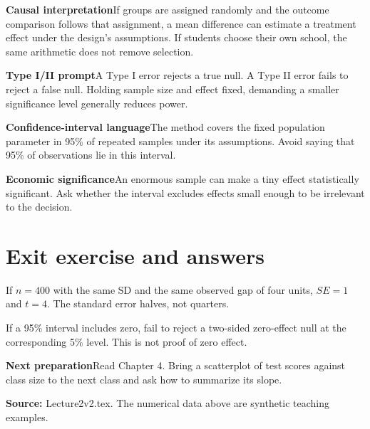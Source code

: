 \documentclass[11pt,a4paper]{article}
\newcommand{\heading}[1]{\section*{\color{accent}#1}}
\newcommand{\cue}[2]{\par\noindent\textbf{#1}\quad #2\par}
\begin{document}
\cue{Causal interpretation}{If groups are assigned randomly and the outcome comparison follows that assignment, a mean difference can estimate a treatment effect under the design's assumptions. If students choose their own school, the same arithmetic does not remove selection.}
\cue{Type I/II prompt}{A Type I error rejects a true null. A Type II error fails to reject a false null. Holding sample size and effect fixed, demanding a smaller significance level generally reduces power.}
\cue{Confidence-interval language}{The method covers the fixed population parameter in 95\% of repeated samples under its assumptions. Avoid saying that 95\% of observations lie in this interval.}
\cue{Economic significance}{An enormous sample can make a tiny effect statistically significant. Ask whether the interval excludes effects small enough to be irrelevant to the decision.}
\heading{Exit exercise and answers}
If $n=400$ with the same SD and the same observed gap of four units, $SE=1$ and $t=4$. The standard error halves, not quarters.

If a 95\% interval includes zero, fail to reject a two-sided zero-effect null at the corresponding 5\% level. This is not proof of zero effect.

\cue{Next preparation}{Read Chapter 4. Bring a scatterplot of test scores against class size to the next class and ask how to summarize its slope.}
\textbf{Source:} Lecture2v2.tex. The numerical data above are synthetic teaching examples.
\end{document}
